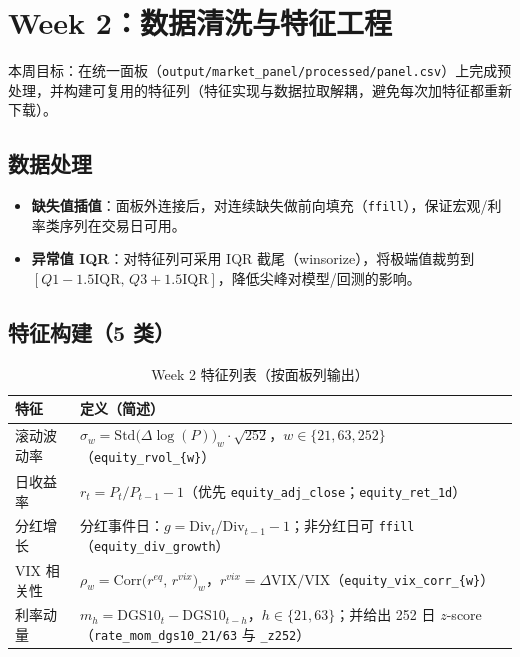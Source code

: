 \documentclass[11pt]{article}
\begin{document}


\section{Week 2：数据清洗与特征工程}

本周目标：在统一面板（\texttt{output/market\_panel/processed/panel.csv}）上完成预处理，并构建可复用的特征列（特征实现与数据拉取解耦，避免每次加特征都重新下载）。

\subsection{数据处理}
\begin{itemize}
  \item \textbf{缺失值插值}：面板外连接后，对连续缺失做前向填充（\texttt{ffill}），保证宏观/利率类序列在交易日可用。
  \item \textbf{异常值 IQR}：对特征列可采用 IQR 截尾（winsorize），将极端值裁剪到 $[Q1-1.5\mathrm{IQR},\, Q3+1.5\mathrm{IQR}]$，降低尖峰对模型/回测的影响。
\end{itemize}

\subsection{特征构建（5 类）}
\begin{table}[H]
  \centering
  \renewcommand{\arraystretch}{1.15}
  \begin{tabularx}{\textwidth}{lX}
    \toprule
    特征 & 定义（简述） \\
    \midrule
    滚动波动率 & $\sigma_w=\mathrm{Std}\big(\Delta\log(P)\big)_w\cdot\sqrt{252}$，$w\in\{21,63,252\}$（\texttt{equity\_rvol\_\{w\}}）\\
    日收益率 & $r_t=P_t/P_{t-1}-1$（优先 \texttt{equity\_adj\_close}；\texttt{equity\_ret\_1d}）\\
    分红增长 & 分红事件日：$g=\mathrm{Div}_t/\mathrm{Div}_{t-1}-1$；非分红日可 \texttt{ffill}（\texttt{equity\_div\_growth}）\\
    VIX 相关性 & $\rho_w=\mathrm{Corr}\big(r^{eq},\, r^{vix}\big)_w$，$r^{vix}=\Delta\mathrm{VIX}/\mathrm{VIX}$（\texttt{equity\_vix\_corr\_\{w\}}）\\
    利率动量 & $m_h=\mathrm{DGS10}_t-\mathrm{DGS10}_{t-h}$，$h\in\{21,63\}$；并给出 252 日 $z$-score（\texttt{rate\_mom\_dgs10\_21/63} 与 \texttt{\_z252}）\\
    \bottomrule
  \end{tabularx}
  \caption{Week 2 特征列表（按面板列输出）}
\end{table}
\end{document}
